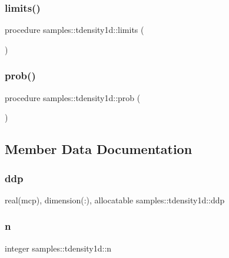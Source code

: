 \subsubsection{\texorpdfstring{limits()}{limits()}}
{\footnotesize\ttfamily procedure samples\+::tdensity1d\+::limits (\begin{DoxyParamCaption}{ }\end{DoxyParamCaption})}

\mbox{\label{structsamples_1_1tdensity1d_a7ac22a9053b7bc9bf5667fe9f1da889f}} 
\subsubsection{\texorpdfstring{prob()}{prob()}}
{\footnotesize\ttfamily procedure samples\+::tdensity1d\+::prob (\begin{DoxyParamCaption}{ }\end{DoxyParamCaption})}



\subsection{Member Data Documentation}
\mbox{\label{structsamples_1_1tdensity1d_a7ed3bbeb3bb89bebd952925095962368}} 
\subsubsection{\texorpdfstring{ddp}{ddp}}
{\footnotesize\ttfamily real(mcp), dimension(\+:), allocatable samples\+::tdensity1d\+::ddp}

\mbox{\label{structsamples_1_1tdensity1d_a5662dfb72ed4b1da1c667d3d2a013573}} 
\subsubsection{\texorpdfstring{n}{n}}
{\footnotesize\ttfamily integer samples\+::tdensity1d\+::n}

